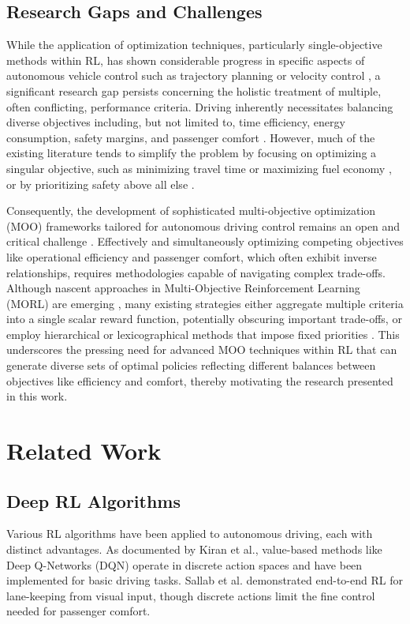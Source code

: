 \documentclass[12pt,a4paper]{article}
\begin{document}
\subsection{Research Gaps and Challenges}
While the application of optimization techniques, particularly single-objective methods within RL, has shown considerable progress in specific aspects of autonomous vehicle control such as trajectory planning or velocity control \cite{survey2023, kiran2022, lillicrap2016}, a significant research gap persists concerning the holistic treatment of multiple, often conflicting, performance criteria. Driving inherently necessitates balancing diverse objectives including, but not limited to, time efficiency, energy consumption, safety margins, and passenger comfort \cite{he2023}. However, much of the existing literature tends to simplify the problem by focusing on optimizing a singular objective, such as minimizing travel time or maximizing fuel economy \cite{zhu2021, he2023}, or by prioritizing safety above all else \cite{zhu2021}.

Consequently, the development of sophisticated multi-objective optimization (MOO) frameworks tailored for autonomous driving control remains an open and critical challenge \cite{survey2023}. Effectively and simultaneously optimizing competing objectives like operational efficiency and passenger comfort, which often exhibit inverse relationships, requires methodologies capable of navigating complex trade-offs. Although nascent approaches in Multi-Objective Reinforcement Learning (MORL) are emerging \cite{li2019, yang2019, zhang2023, jin2025, selvaraj2023}, many existing strategies either aggregate multiple criteria into a single scalar reward function, potentially obscuring important trade-offs, or employ hierarchical or lexicographical methods that impose fixed priorities \cite{li2019, zhang2023}. This underscores the pressing need for advanced MOO techniques within RL that can generate diverse sets of optimal policies reflecting different balances between objectives like efficiency and comfort, thereby motivating the research presented in this work.

\section{Related Work}

\subsection{Deep RL Algorithms}
Various RL algorithms have been applied to autonomous driving, each with distinct advantages. As documented by Kiran et al.\cite{kiran2022}, value-based methods like Deep Q-Networks (DQN) operate in discrete action spaces and have been implemented for basic driving tasks\cite{hossain2023}. Sallab et al.\cite{sallab2016} demonstrated end-to-end RL for lane-keeping from visual input, though discrete actions limit the fine control needed for passenger comfort.
\end{document}
